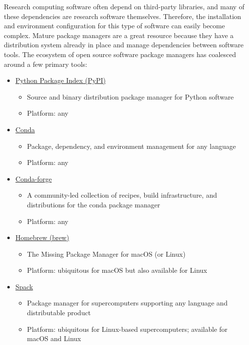 \documentclass[]{nlr}
\begin{document}
Research computing software often depend on third-party libraries, and many of these dependencies
are research software themselves. Therefore, the installation and environment configuration
for this type of software can easily become complex.
Mature package managers are a great resource because they have a distribution system already in place
and manage dependencies between software tools.
The ecosystem of open source software package managers has coalesced around a few primary tools:
\begin{itemize}

\item \href{https://pypi.org}{Python Package Index (PyPI)}
\begin{itemize}
\item Source and binary distribution package manager for Python software
\item Platform: any
\end{itemize}

\item \href{https://docs.conda.io/en/latest/}{Conda}
\begin{itemize}
\item Package, dependency, and environment management for any language
\item Platform: any
\end{itemize}

\item \href{https://conda-forge.org}{Conda-forge}
\begin{itemize}
\item A community-led collection of recipes, build infrastructure, and distributions for the conda package manager
\item Platform: any
\end{itemize}

\item \href{https://brew.sh}{Homebrew (brew)}
\begin{itemize}
\item The Missing Package Manager for macOS (or Linux)
\item Platform: ubiquitous for macOS but also available for Linux
\end{itemize}

\item \href{https://spack.io}{Spack}
\begin{itemize}
\item Package manager for supercomputers supporting any language and distributable product
\item Platform: ubiquitous for Linux-based supercomputers;  available for macOS and Linux
\end{itemize}


\end{itemize}
\end{document}
